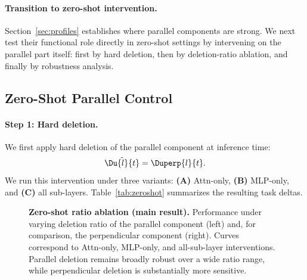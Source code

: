 \paragraph{Transition to zero-shot intervention.}
Section~\ref{sec:profiles} establishes where parallel components are strong.
We next test their functional role directly in zero-shot settings by
intervening on the parallel part itself: first by hard deletion, then by
deletion-ratio ablation, and finally by robustness analysis.

\subsection{Zero-Shot Parallel Control}
\label{sec:zeroshot}

\paragraph{Step 1: Hard deletion.}
We first apply hard deletion of the parallel component at inference time:
\begin{equation}
  \tilde{\Du{l}{t}} = \Duperp{l}{t}.
\end{equation}
We run this intervention under three variants:
\textbf{(A)} Attn-only, \textbf{(B)} MLP-only, and \textbf{(C)} all sub-layers.
Table~\ref{tab:zeroshot} summarizes the resulting task deltas.

\begin{figure}[t]
  \centering
  \fbox{\rule{0pt}{5.0cm}\rule{0.92\linewidth}{0pt}}
  \caption{\textbf{Zero-shot ratio ablation (main result).}
           Performance under varying deletion ratio of the parallel component
           (left) and, for comparison, the perpendicular component (right).
           Curves correspond to Attn-only, MLP-only, and all-sub-layer
           interventions. Parallel deletion remains broadly robust over a wide
           ratio range, while perpendicular deletion is substantially more
           sensitive.}
  \label{fig:zeroshot-scale-sweep}
\end{figure}

